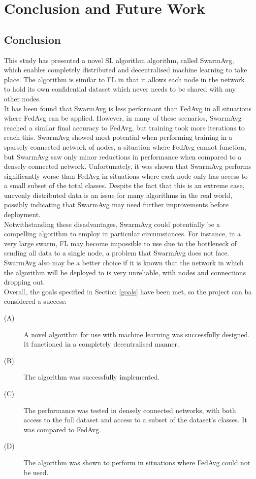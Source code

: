 \chapter{Conclusion and Future Work}
\section{Conclusion}
This study has presented a novel SL algorithm algorithm, called SwarmAvg, which enables completely distributed and decentralised machine learning to take place. The algorithm is similar to FL in that it allows each node in the network to hold its own confidential dataset which never needs to be shared with any other nodes. \\

It has been found that SwarmAvg is less performant than FedAvg in all situations where FedAvg can be applied. However, in many of these scenarios, SwarmAvg reached a similar final accuracy to FedAvg, but training took more iterations to reach this. SwarmAvg showed most potential when performing training in a sparsely connected network of nodes, a situation where FedAvg cannot function, but SwarmAvg saw only minor reductions in performance when compared to a densely connected network. Unfortunately, it was shown that SwarmAvg performs significantly worse than FedAvg in situations where each node only has access to a small subset of the total classes. Despite the fact that this is an extreme case, unevenly distributed data is an issue for many algorithms in the real world, possibly indicating that SwarmAvg may need further improvements before deployment. \\

Notwithstanding these disadvantages, SwarmAvg could potentially be a compelling algorithm to employ in particular circumstances. For instance, in a very large swarm, FL may become impossible to use due to the bottleneck of sending all data to a single node, a problem that SwarmAvg does not face. SwarmAvg also may be a better choice if it is known that the network in which the algorithm will be deployed to is very unreliable, with nodes and connections dropping out. \\

Overall, the goals specified in Section \ref{goals} have been met, so the project can ba considered a success:
\begin{description}
	\item[(A)] A novel algorithm for use with machine learning was successfully designed. It functioned in a completely decentralised manner.
	\item[(B)] The algorithm was successfully implemented.
	\item[(C)] The performance was tested in densely connected networks, with both access to the full dataset and access to a subset of the dataset's classes. It was compared to FedAvg.
	\item[(D)] The algorithm was shown to perform in situations where FedAvg could not be used.
\end{description}

